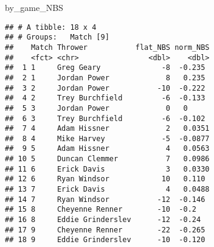 \documentclass[
]{article}
\newenvironment{Shaded}{\begin{snugshade}}{\end{snugshade}}
\newcommand{\NormalTok}[1]{#1}
\begin{document}
\begin{Shaded}
\begin{Highlighting}[]
\NormalTok{by\_game\_NBS}
\end{Highlighting}
\end{Shaded}

\begin{verbatim}
## # A tibble: 18 x 4
## # Groups:   Match [9]
##    Match Thrower           flat_NBS norm_NBS
##    <fct> <chr>                <dbl>    <dbl>
##  1 1     Greg Geary              -8  -0.235 
##  2 1     Jordan Power             8   0.235 
##  3 2     Jordan Power           -10  -0.222 
##  4 2     Trey Burchfield         -6  -0.133 
##  5 3     Jordan Power             0   0     
##  6 3     Trey Burchfield         -6  -0.102 
##  7 4     Adam Hissner             2   0.0351
##  8 4     Mike Harvey             -5  -0.0877
##  9 5     Adam Hissner             4   0.0563
## 10 5     Duncan Clemmer           7   0.0986
## 11 6     Erick Davis              3   0.0330
## 12 6     Ryan Windsor            10   0.110 
## 13 7     Erick Davis              4   0.0488
## 14 7     Ryan Windsor           -12  -0.146 
## 15 8     Cheyenne Renner        -10  -0.2   
## 16 8     Eddie Grinderslev      -12  -0.24  
## 17 9     Cheyenne Renner        -22  -0.265 
## 18 9     Eddie Grinderslev      -10  -0.120
\end{verbatim}
\end{document}
